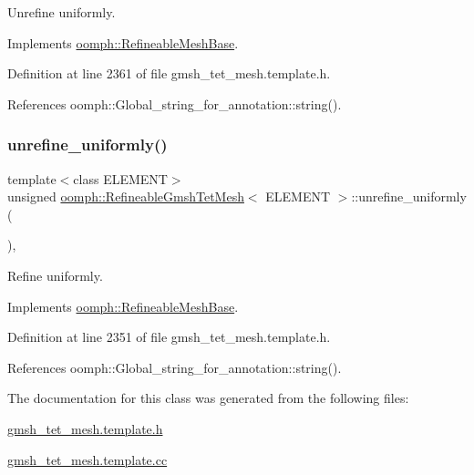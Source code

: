 Unrefine uniformly. 



Implements \hyperlink{classoomph_1_1RefineableMeshBase_afe5810e718ce1939f3f81e3eb5743768}{oomph\+::\+Refineable\+Mesh\+Base}.



Definition at line 2361 of file gmsh\+\_\+tet\+\_\+mesh.\+template.\+h.



References oomph\+::\+Global\+\_\+string\+\_\+for\+\_\+annotation\+::string().

\mbox{\label{classoomph_1_1RefineableGmshTetMesh_aa243fd14b5f168f541e5451766a9f68d}} 
\subsubsection{\texorpdfstring{unrefine\+\_\+uniformly()}{unrefine\_uniformly()}}
{\footnotesize\ttfamily template$<$class E\+L\+E\+M\+E\+NT$>$ \\
unsigned \hyperlink{classoomph_1_1RefineableGmshTetMesh}{oomph\+::\+Refineable\+Gmsh\+Tet\+Mesh}$<$ E\+L\+E\+M\+E\+NT $>$\+::unrefine\+\_\+uniformly (\begin{DoxyParamCaption}{ }\end{DoxyParamCaption})\hspace{0.3cm}{\ttfamily [inline]}, {\ttfamily [virtual]}}



Refine uniformly. 



Implements \hyperlink{classoomph_1_1RefineableMeshBase_a5bbd5c85e7c5c9e75c5a28155ac3f956}{oomph\+::\+Refineable\+Mesh\+Base}.



Definition at line 2351 of file gmsh\+\_\+tet\+\_\+mesh.\+template.\+h.



References oomph\+::\+Global\+\_\+string\+\_\+for\+\_\+annotation\+::string().



The documentation for this class was generated from the following files\+:\begin{DoxyCompactItemize}
\item 
\hyperlink{gmsh__tet__mesh_8template_8h}{gmsh\+\_\+tet\+\_\+mesh.\+template.\+h}\item 
\hyperlink{gmsh__tet__mesh_8template_8cc}{gmsh\+\_\+tet\+\_\+mesh.\+template.\+cc}\end{DoxyCompactItemize}
